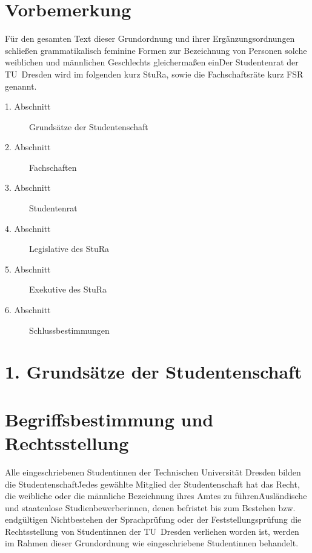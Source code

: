 

\setcounter{section}{0} %
\begin{multicols}{2}

\section*{Vorbemerkung}
\Satz Für den gesamten Text dieser Grundordnung und ihrer Ergänzungsordnungen schließen grammatikalisch feminine Formen zur Bezeichnung von Personen solche weiblichen und männlichen Geschlechts gleichermaßen ein\. Der 															Studentenrat der TU~Dresden wird im folgenden kurz StuRa, sowie die Fachschaftsräte kurz FSR genannt.



\begin{description}
\item[1. Abschnitt] Grundsätze der Studentenschaft
\item[2. Abschnitt] Fachschaften
\item[3. Abschnitt] Studentenrat
\item[4. Abschnitt] Legislative des StuRa
\item[5. Abschnitt] Exekutive des StuRa
\item[6. Abschnitt] Schlussbestimmungen
\end{description}



\section*{1. Grundsätze der Studentenschaft}



\section{Begriffsbestimmung und Rechtsstellung}

\Abs \Satz Alle eingeschriebenen Studentinnen der Technischen Universität Dresden bilden die Studentenschaft\. Jedes gewählte Mitglied der Studentenschaft hat das Recht, die weibliche oder die männliche Bezeichnung ihres Amtes zu führen\. Ausländische 	und staatenlose Studienbewerberinnen, denen befristet bis zum Bestehen bzw. endgültigen Nichtbestehen der Sprachprüfung oder 		der Feststellungsprüfung die Rechtsstellung von Studentinnen der TU~Dresden verliehen worden ist, werden im Rahmen dieser 			Grundordnung wie eingeschriebene Studentinnen behandelt.
  

\end{multicols}

